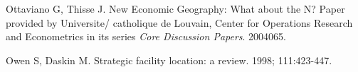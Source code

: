 \documentclass[twoside,twocolumn]{article}
\begin{document}
\begin{thebibliography}{99}
Ottaviano G, Thisse J.
\newblock New Economic Geography: What about the N?
\newblock Paper provided by Universite/ catholique de Louvain, Center for Operations Research and Econometrics in its series {\em Core Discussion Papers}. 2004065.

Owen S, Daskin M.
\newblock Strategic facility location: a review.
 1998; 111:423-447.


\end{thebibliography}

\end{document}
